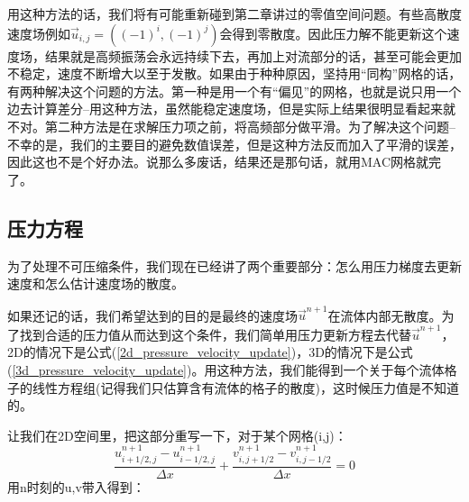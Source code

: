\documentclass{article}
\begin{document}
用这种方法的话，我们将有可能重新碰到第二章讲过的零值空间问题。有些高散度速度场例如$\vec{u}_{i,j}=((-1)^i,(-1)^j)$会得到零散度。因此压力解不能更新这个速度场，结果就是高频振荡会永远持续下去，再加上对流部分的话，甚至可能会更加不稳定，速度不断增大以至于发散。如果由于种种原因，坚持用“同构”网格的话，有两种解决这个问题的方法。第一种是用一个有“偏见”的网格，也就是说只用一个边去计算差分--用这种方法，虽然能稳定速度场，但是实际上结果很明显看起来就不对。第二种方法是在求解压力项之前，将高频部分做平滑。为了解决这个问题--不幸的是，我们的主要目的避免数值误差，但是这种方法反而加入了平滑的误差，因此这也不是个好办法。说那么多废话，结果还是那句话，就用MAC网格就完了。
\subsection{压力方程}
为了处理不可压缩条件，我们现在已经讲了两个重要部分：怎么用压力梯度去更新速度和怎么估计速度场的散度。
\par
如果还记的话，我们希望达到的目的是最终的速度场$\vec{u}^{n+1}$在流体内部无散度。为了找到合适的压力值从而达到这个条件，我们简单用压力更新方程去代替$\vec{u}^{n+1}$，2D的情况下是公式(\ref{2d_pressure_velocity_update})，3D的情况下是公式(\ref{3d_pressure_velocity_update})。用这种方法，我们能得到一个关于每个流体格子的线性方程组(记得我们只估算含有流体的格子的散度)，这时候压力值是不知道的。
\par
让我们在2D空间里，把这部分重写一下，对于某个网格(i,j)：
\begin{equation}
\frac{u^{n+1}_{i+1/2,j}-u^{n+1}_{i-1/2,j}}{\Delta{x}}+\frac{v^{n+1}_{i,j+1/2}-v^{n+1}_{i,j-1/2}}{\Delta{x}}=0
\end{equation}
用n时刻的u,v带入得到：
\end{document}
